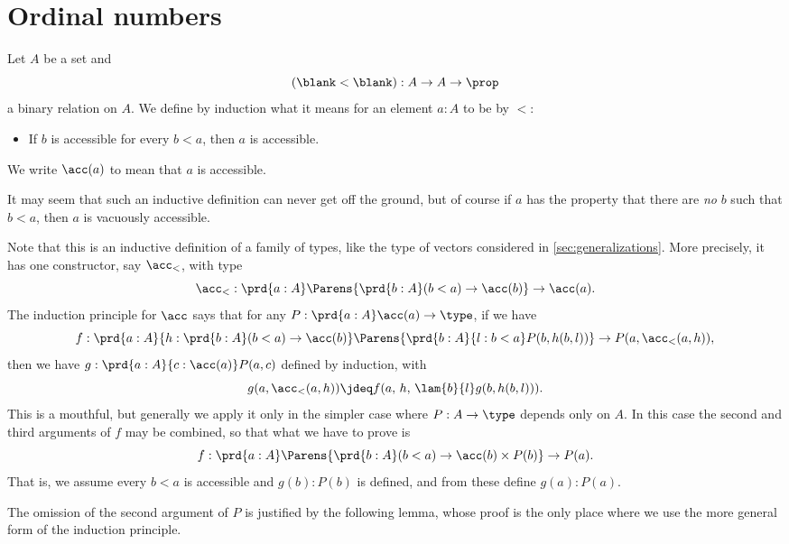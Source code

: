 \section{Ordinal numbers}
\label{sec:ordinals}

%

\begin{defn}\label{defn:accessibility}
  Let $A$ be a set and
  \[(\blank<\blank):A\to A\to \prop\]
  a binary relation on $A$.
  We define by induction what it means for an element $a:A$ to be 
  by $<$:
  \begin{itemize}
  \item If $b$ is accessible for every $b<a$, then $a$ is accessible.
  \end{itemize}
  We write $\acc(a)$ to mean that $a$ is accessible.
\end{defn}

It may seem that such an inductive definition can never get off the ground, but of course if $a$ has the property that there are \emph{no} $b$ such that $b<a$, then $a$ is vacuously accessible.

Note that this is an inductive definition of a family of types, like the type of vectors considered in \cref{sec:generalizations}.
More precisely, it has one constructor, say $\acc_<$, with type
\[ \acc_< : \prd{a:A} \Parens{\prd{b:A} (b<a) \to \acc(b)} \to \acc(a). \]
%
The induction principle for $\acc$ says that for any $P:\prd{a:A} \acc(a) \to \type$, if we have
\[f:\prd{a:A}{h:\prd{b:A} (b<a) \to \acc(b)}
\Parens{\prd{b:A}{l:b<a} P(b,h(b,l))} \to
P(a,\acc_<(a,h)),
\]
then we have $g:\prd{a:A}{c:\acc(a)} P(a,c)$ defined by induction, with
\[g(a,\acc_<(a,h)) \jdeq f(a,\,h,\,\lam{b}{l} g(b,h(b,l))).\]
This is a mouthful, but generally we apply it only in the simpler case where $P:A\to\type$ depends only on $A$.
In this case the second and third arguments of $f$ may be combined, so that what we have to prove is
\[f:\prd{a:A} \Parens{\prd{b:A} (b<a) \to \acc(b) \times P(b)}
\to P(a).
\]
That is, we assume every $b<a$ is accessible and $g(b):P(b)$ is defined, and from these define $g(a):P(a)$.

The omission of the second argument of $P$ is justified by the following lemma, whose proof is the only place where we use the more general form of the induction principle.

